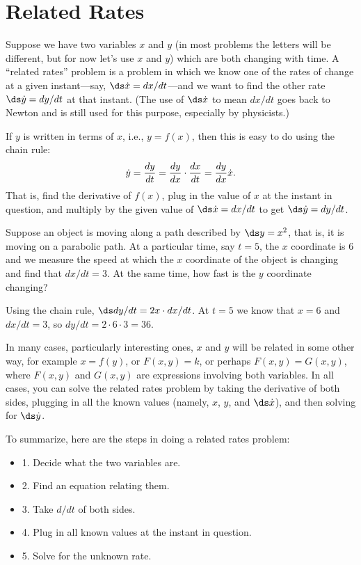 \section{Related Rates}{}{}
\label{sec:related rates}
\nobreak
Suppose we have two variables $x$ and $y$ (in most problems the
letters will be different, but for now let's use $x$ and $y$) which
are both changing with time.  A ``related rates'' problem is a problem
in which we know one of the rates of change at a given instant---say,
$\ds \dot x = dx/dt$---and we want to find the other rate $\ds \dot y = dy/dt$ at that
instant. (The use of $\ds \dot x$ 
to mean $dx/dt$ goes back to Newton and
is still used for this purpose, especially by physicists.)

If $y$ is written in terms of $x$, i.e., $y=f(x)$, then this is easy
to do using the chain rule:
$$
\dot y = {dy\over dt}={dy\over dx}\cdot{dx\over dt}={dy\over dx}\dot x.
$$
That is, find the derivative of $f(x)$, plug in the value of
$x$ at the instant in question, and multiply by the given value of
$\ds \dot{x}=dx/dt$ to get $\ds \dot{y}=dy/dt$.

\begin{example}
Suppose an object is moving along a path described by $\ds y=x^2$, that
is, it is moving on a parabolic path. At a particular time, say $t=5$,
the $x$ coordinate is 6 and 
we measure the speed at which the $x$ coordinate of the object is
changing and find that $dx/dt = 3$. At the same time, how fast is the
$y$ coordinate changing?

Using the chain rule, $\ds dy/dt = 2x\cdot dx/dt$. At $t=5$ we know that
$x=6$ and $dx/dt=3$, so $dy/dt = 2\cdot 6\cdot 3 = 36$.
\end{example}

In many cases, particularly interesting ones,
$x$ and $y$ will be related in some other way, for example
$x=f(y)$, or $F(x,y)=k$, or perhaps $F(x,y)=G(x,y)$, where $F(x,y)$
and $G(x,y)$ are expressions involving both variables.  In all cases, you
can solve the related rates problem by taking the derivative of both sides,
plugging in all the known values (namely, $x$, $y$, and $\ds \dot{x}$), and
then solving for $\ds \dot{y}$.

To summarize, here are the steps in doing a related rates problem:

\begin{itemize} %

\item{1.} Decide what the two variables are.
\item{2.}  Find an equation relating them.
\item{3.}  Take $d/dt$ of both sides.
\item{4.}  Plug in all known values at the instant in question.
\item{5.}  Solve for the unknown rate.

\end{itemize}


